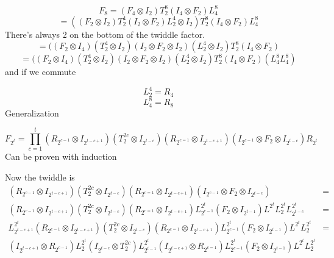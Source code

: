 \documentclass{article}
\begin{document}
	\begin{equation}
		F_8 = (F_4 \otimes I_2)T^{8}_2(I_4 \otimes F_2)L^8_4
	\end{equation}
	\begin{equation}
		=((F_2 \otimes I_2)T^4_2(I_2 \otimes F_2)L^4_2 \otimes I_2)T^8_2 (I_4 \otimes F_2)L^8_4
	\end{equation}
	There's always 2 on the bottom of the twiddle factor.
	\begin{equation}
		=((F_2 \otimes I_4)(T^4_2 \otimes I_2)(I_2 \otimes F_2 \otimes I_2)(L^4_2 \otimes I_2)T^8_2 (I_4 \otimes F_2)
	\end{equation}
	\begin{equation}
		=((F_2 \otimes I_4)(T^4_2 \otimes I_2)(I_2 \otimes F_2 \otimes I_2)(L^4_2 \otimes I_2)T^8_2 (I_4 \otimes F_2)(L^8_4L^8_4)
	\end{equation}
	and if we commute
	
	\begin{equation}
		L^4_2 = R_{4}
	\end{equation}
	\begin{equation}
		L^8_4 = R_8
	\end{equation}
	Generalization
	
	\begin{equation}
		F_{2^t} = \prod^{t}_{c=1}(R_{2^{c-1}} \otimes I_{2^{t-c+1}})(T^{2c}_2 \otimes I_{2^{t-c}})(R_{2^{c=1}} \otimes I_{2^{t-c+1}})(I_{2^{c-1}} \otimes F_2 \otimes I_{2^{t-c}})R_{2^t}
	\end{equation}
	Can be proven with induction
	
	Now the twiddle is
	\begin{align}
		(R_{2^{c-1}} \otimes I_{2^{t-c+1}})(T^{2c}_2 \otimes I_{2^{t-c}})(R_{2^{c=1}} \otimes I_{2^{t-c+1}})(I_{2^{c-1}} \otimes F_2 \otimes I_{2^{t-c}}) &=\\
		(R_{2^{c-1}} \otimes I_{2^{t-c+1}})(T^{2c}_2 \otimes I_{2^{t-c}})(R_{2^{c=1}} \otimes I_{2^{t-c+1}})L^{2^t}_{2^{c-1}}(F_2 \otimes I_{2^{t-1}})L^{2^t}L^{2^t}_2L^{2^t}_{2^{t-c}} &= \\
		L^{2^t}_{2^{t-c+1}}(R_{2^{c-1}} \otimes I_{2^{t-c+1}})(T^{2c}_2 \otimes I_{2^{t-c}})(R_{2^{c=1}} \otimes I_{2^{t-c+1}})L^{2^t}_{2^{c-1}}(F_2 \otimes I_{2^{t-1}})L^{2^t}L^{2^t}_2 &= \\
		(I_{2^{t-c+1}} \otimes R_{2^{c-1}})L^{2^t}_2(I_{2^{t-c}} \otimes T^{2c}_2 )L^{2^t}_{2^{t-1}}(I_{2^{t-c+1}} \otimes R_{2^{c=1}})L^{2^t}_{2^{c-1}}(F_2 \otimes I_{2^{t-1}})L^{2^t}L^{2^t}_2
	\end{align}
\end{document}
